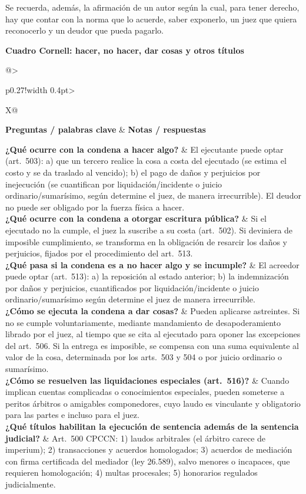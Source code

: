 \documentclass[12pt,oneside]{book}
\makeatletter
\newcommand{\cornelltitle}[1]{\par\bigskip\noindent\textbf{\sffamily Cuadro Cornell: #1}\par\nopagebreak\smallskip}
\newcommand{\cqrow}[2]{\textbf{#1} & #2 \\[0.5em]}
\newcommand{\cornellblock}[1]{%
  \noindent\begin{tabularx}{\textwidth}{@{}>{\raggedright\arraybackslash}p{0.27\textwidth}!{\vrule width 0.4pt}>{\raggedright\arraybackslash}X@{}}
  \toprule
  \textbf{Preguntas / palabras clave} & \textbf{Notas / respuestas} \\
  \midrule
  #1
  \bottomrule
  \end{tabularx}\par}
\makeatother
\begin{document}
Se recuerda, además, la afirmación de un autor según la cual, para tener derecho, hay que contar con la norma que lo acuerde, saber exponerlo, un juez que quiera reconocerlo y un deudor que pueda pagarlo.

\cornelltitle{hacer, no hacer, dar cosas y otros títulos}
\cornellblock{
\cqrow{¿Qué ocurre con la condena a hacer algo?}{El ejecutante puede optar (art.~503): a) que un tercero realice la cosa a costa del ejecutado (se estima el costo y se da traslado al vencido); b) el pago de daños y perjuicios por inejecución (se cuantifican por liquidación/incidente o juicio ordinario/sumarísimo, según determine el juez, de manera irrecurrible). El deudor no puede ser obligado por la fuerza física a hacer.
}
\cqrow{¿Qué ocurre con la condena a otorgar escritura pública?}{Si el ejecutado no la cumple, el juez la suscribe a su costa (art.~502). Si deviniera de imposible cumplimiento, se transforma en la obligación de resarcir los daños y perjuicios, fijados por el procedimiento del art.~513.
}
\cqrow{¿Qué pasa si la condena es a no hacer algo y se incumple?}{El acreedor puede optar (art.~513): a) la reposición al estado anterior; b) la indemnización por daños y perjuicios, cuantificados por liquidación/incidente o juicio ordinario/sumarísimo según determine el juez de manera irrecurrible.
}
\cqrow{¿Cómo se ejecuta la condena a dar cosas?}{Pueden aplicarse astreintes. Si no se cumple voluntariamente, mediante mandamiento de desapoderamiento librado por el juez, al tiempo que se cita al ejecutado para oponer las excepciones del art.~506. Si la entrega es imposible, se compensa con una suma equivalente al valor de la cosa, determinada por los arts.~503 y 504 o por juicio ordinario o sumarísimo.
}
\cqrow{¿Cómo se resuelven las liquidaciones especiales (art.~516)?}{Cuando implican cuentas complicadas o conocimientos especiales, pueden someterse a peritos árbitros o amigables componedores, cuyo laudo es vinculante y obligatorio para las partes e incluso para el juez.
}
\cqrow{¿Qué títulos habilitan la ejecución de sentencia además de la sentencia judicial?}{Art.~500 CPCCN: 1) laudos arbitrales (el árbitro carece de imperium); 2) transacciones y acuerdos homologados; 3) acuerdos de mediación con firma certificada del mediador (ley 26.589), salvo menores o incapaces, que requieren homologación; 4) multas procesales; 5) honorarios regulados judicialmente.
}
}
\medskip
\end{document}
